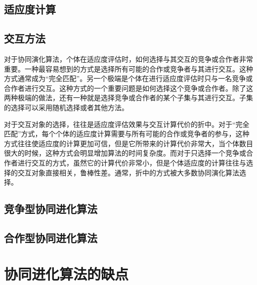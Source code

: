 \documentclass[a4paper]{article}
\begin{document}
    \subsection{适应度计算}
    
    \subsection{交互方法}
    
    对于协同演化算法，个体在适应度评估时，如何选择与其交互的竞争或合作者非常重要。一种最容易想到的方式是选择所有可能的合作或竞争者与其进行交互。这种方式通常成为“完全匹配”。另一个极端是个体在进行适应度评估时只与一名竞争或合作者进行交互。这种方式的一个重要问题是如何选择这个竞争或合作者。除了这两种极端的做法，还有一种就是选择竞争或合作者的某个子集与其进行交互。子集的选择可以采用随机选择或者其他方法。

    对于交互对象的选择，往往是适应度评估效果与交互计算代价的折中。对于“完全匹配”方式，每个个体的适应度计算需要与所有可能的合作或竞争者的参与，这种方式往往使适应度的计算更加可信，但是它所带来的计算代价非常大，当个体数目很大的时候，这种方式会明显增加算法的时间复杂度。而对于只选择一个竞争或合作者进行交互的方式，虽然它的计算代价非常小，但是个体适应度的计算往往与选择的交互对象直接相关，鲁棒性差。通常，折中的方式被大多数协同演化算法选择。

    \subsection{竞争型协同进化算法}

    \subsection{合作型协同进化算法}

    \newpage
    \section{协同进化算法的缺点}

    \newpage
    
    
\end{document}
